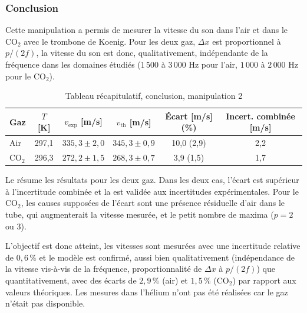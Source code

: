 \subsubsection{Conclusion}

Cette manipulation a permis de mesurer la vitesse du son dans l'air et dans le CO$_2$ avec le trombone de Koenig. Pour les deux gaz, $\Delta x$ est proportionnel à $p/(2f)$, la vitesse du son est donc, qualitativement, indépendante de la fréquence dans les domaines étudiés ($1\,500$ à $3\,000$ Hz pour l'air, $1\,000$ à $2\,000$ Hz pour le CO$_2$).

\begin{table}[H]
    \centering
    \small
    \begin{tabular}{lccccc}
        \toprule
        Gaz & $T$ [K] & $v_{\text{exp}}$ [m/s] & $v_{\text{th}}$ [m/s] & Écart [m/s] (\%) & Incert. combinée [m/s] \\
        \midrule
        Air    & 297,1 & $335{,}3 \pm 2{,}0$ & $345{,}3 \pm 0{,}9$ & 10,0 (2,9) & 2,2 \\
        CO$_2$ & 296,3 & $272{,}2 \pm 1{,}5$ & $268{,}3 \pm 0{,}7$ & 3,9 (1,5)  & 1,7 \\
        \bottomrule
    \end{tabular}
    \caption{Tableau récapitulatif, conclusion, manipulation 2}
    \label{tab:conclusion-trombone}
\end{table}

Le  résume les résultats pour les deux gaz. Dans les deux cas, l'écart est supérieur à l'incertitude combinée et la  est validée aux incertitudes expérimentales. Pour le CO$_2$, les causes supposées de l'écart sont une présence résiduelle d'air dans le tube, qui augmenterait la vitesse mesurée, et le petit nombre de maxima ($p = 2$ ou $3$).

L'objectif est donc atteint, les vitesses sont mesurées avec une incertitude relative de $0{,}6\,\%$ et le modèle est confirmé, aussi bien qualitativement (indépendance de la vitesse vis-à-vis de la fréquence, proportionnalité de $\Delta x$ à $p/(2f)$) que quantitativement, avec des écarts de $2{,}9\,\%$ (air) et $1{,}5\,\%$ (CO$_2$) par rapport aux valeurs théoriques. Les mesures dans l'hélium n'ont pas été réalisées car le gaz n'était pas disponible.
